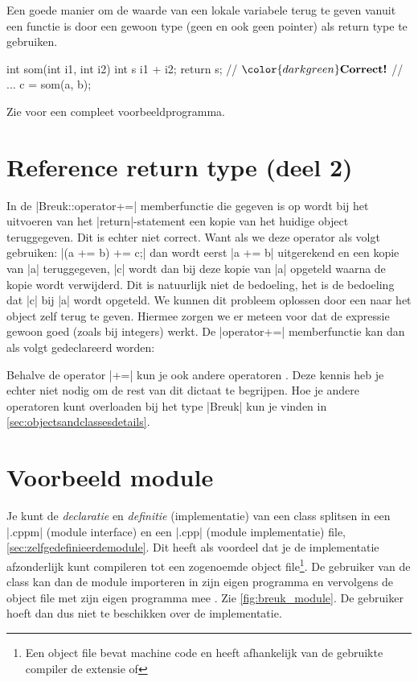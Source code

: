 \begin{cpplstShortInline}
Een goede manier om de waarde van een lokale variabele terug te geven vanuit een functie is door een gewoon type (geen  en ook geen pointer) als return type te gebruiken.  
\begin{cpplstfragment}[mathescape=true]
int som(int i1, int i2) {
    int s {i1 + i2};
    return s; // $\color{darkgreen}\textbf{Correct!}$
}
//  ...
    c = som(a, b);
\end{cpplstfragment}
Zie  voor een compleet voorbeeldprogramma.

\section{Reference return type (deel 2)}
\label{sec:Breuk::operator+=}
In de |Breuk::operator+=| memberfunctie die gegeven is op  wordt bij het uitvoeren van
het |return|\hyp{}statement een kopie van het huidige object teruggegeven. 
Dit is echter niet correct.
Want als we deze operator als volgt gebruiken: |(a += b) += c;| dan wordt eerst |a += b| uitgerekend en een kopie van |a| teruggegeven, |c| wordt dan bij deze kopie van |a| opgeteld waarna de kopie wordt verwijderd.
Dit is natuurlijk niet de bedoeling, het is de bedoeling dat |c| bij |a| wordt opgeteld. We kunnen dit probleem oplossen door een  naar het object zelf terug te geven. 
Hiermee zorgen we er meteen voor dat de expressie \hbox{} gewoon goed (zoals bij integers) werkt. 
De |operator+=| memberfunctie kan dan als volgt gedeclareerd worden:
\label{operator+= correct}

Behalve de operator |+=| kun je ook andere operatoren . 
Deze kennis heb je echter niet nodig om de rest van dit dictaat te begrijpen.
Hoe je andere operatoren kunt overloaden bij het type |Breuk| kun je vinden in \cref{sec:objectsandclassesdetails}.

\section[Voorbeeld module \texttt{breuk}]{Voorbeeld module  \texorpdfstring{}{breuk}}
\label{separaat compileren}
Je kunt de \emph{declaratie} en \emph{definitie} (implementatie) van een class splitsen in een |.cppm| (module interface) en een |.cpp| (module implementatie) file, \cref{sec:zelfgedefinieerdemodule}.
Dit heeft als voordeel dat je de implementatie afzonderlijk kunt compileren tot een zogenoemde object file\footnote{Een object file bevat machine code en heeft afhankelijk van de gebruikte compiler de extensie  of }. 
De gebruiker van de class kan dan de module importeren in zijn eigen programma en vervolgens de object file met zijn eigen programma mee . 
Zie \cref{fig:breuk_module}.
De gebruiker hoeft dan dus niet te beschikken over de implementatie.


\end{cpplstShortInline}
